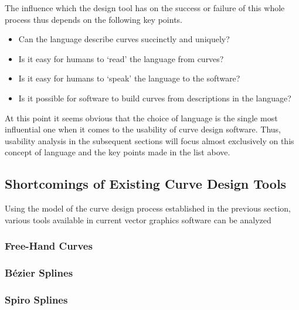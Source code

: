 \documentclass[a4paper]{article}
\begin{document}
			The influence which the design tool has on the success or failure of this whole process thus depends on the following key points.

			\begin{itemize}
				\item Can the language describe curves succinctly and uniquely?
				\item Is it easy for humans to `read' the language from curves?
				\item Is it easy for humans to `speak' the language to the software?
				\item Is it possible for software to build curves from descriptions in the language?
			\end{itemize}

			At this point it seems obvious that the choice of language is the single most influential one when it comes to the usability of curve design software. Thus, usability analysis in the subsequent sections will focus almost exclusively on this concept of language and the key points made in the list above.

		\subsection{Shortcomings of Existing Curve Design Tools}

			Using the model of the curve design process established in the previous section, various tools available in current vector graphics software can be analyzed 

			\subsubsection{Free-Hand Curves}

			\subsubsection{Bézier Splines}

				

			\subsubsection{Spiro Splines}

\end{document}
